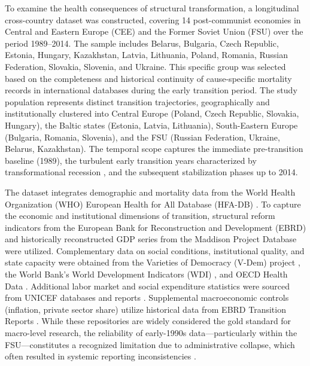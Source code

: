 \documentclass[12pt]{article}
\begin{document}
To examine the health consequences of structural transformation, a longitudinal cross-country dataset was constructed, covering 14 post-communist economies 
in Central and Eastern Europe (CEE) and the Former Soviet Union (FSU) over the period 1989--2014. The sample includes Belarus, Bulgaria, Czech Republic, Estonia, 
Hungary, Kazakhstan, Latvia, Lithuania, Poland, Romania, Russian Federation, Slovakia, Slovenia, and Ukraine. This specific group was selected based on the 
completeness and historical continuity of cause-specific mortality records in international databases during the early transition period. The study population 
represents distinct transition trajectories, geographically and institutionally clustered into Central Europe (Poland, Czech Republic, Slovakia, Hungary), the 
Baltic states (Estonia, Latvia, Lithuania), South-Eastern Europe (Bulgaria, Romania, Slovenia), and the FSU (Russian Federation, Ukraine, Belarus, Kazakhstan). 
The temporal scope captures the immediate pre-transition baseline (1989), the turbulent early transition years characterized by transformational recession 
\citep{Cornia2016, Kornai1994}, and the subsequent stabilization phases up to 2014.

The dataset integrates demographic and mortality data from the World Health Organization (WHO) European Health for All Database (HFA-DB) \citep{WHO_HFA}. 
To capture the economic and institutional dimensions of transition, structural reform indicators from the European Bank for Reconstruction and Development (EBRD) 
\citep{EBRD_Indicators} and historically reconstructed GDP series from the Maddison Project Database \citep{MaddisonProject2020} were utilized. Complementary data 
on social conditions, institutional quality, and state capacity were obtained from the Varieties of Democracy (V-Dem) project \citep{VDem_Dataset}, the World Bank’s 
World Development Indicators (WDI) \citep{WB_GovExpenditure}, and OECD Health Data \citep{OECD_Alcohol}. Additional labor market and social expenditure statistics 
were sourced from UNICEF databases and reports \citep{TransMONEE, UNECE2004}. Supplemental macroeconomic controls (inflation, private sector share) utilize historical 
data from EBRD Transition Reports \citep{EBRD1999, EBRD1994, EBRD2004}. While these repositories are widely considered the gold standard for macro-level research, the 
reliability of early-1990s data---particularly within the FSU---constitutes a recognized limitation due to administrative collapse, which often resulted in systemic 
reporting inconsistencies \citep{Gerry2012, Stuckler2009}.
\end{document}
